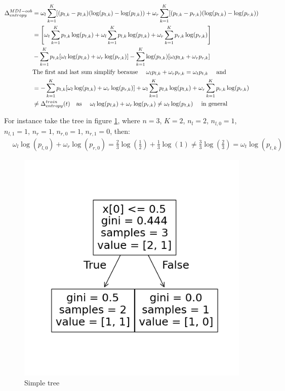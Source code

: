\documentclass{article}
\begin{document}
\begin{align*}
    \Delta_{entropy}^{MDI-oob} &= \omega_l \sum_{k=1}^K [(p_{t,k} - p_{l,k})(\log(p_{t,k}) - \log(p_{l,k})) + \omega_r \sum_{k=1}^K [(p_{t,k} - p_{r,k})(\log(p_{t,k}) - \log(p_{r,k}))\\ 
    &= \left[\omega_t \sum_{k = 1}^K p_{t,k}\log(p_{t,k}) + \omega_{l} \sum_{k = 1}^K p_{l,k}\log(p_{l,k}) + \omega_{r} \sum_{k = 1}^K p_{r,k} \log(p_{r,k}) \right] \\
    &- \sum_{k=1}^K p_{t,k}[\omega_l\log(p_{l,k}) + \omega_r\log(p_{r,k})] - \sum_{k=1}^K \log(p_{t,k})[\omega_lp_{l,k} + \omega_rp_{r,k}] \\
    &\text{The first and last sum simplify because \quad $\omega_l p_{l,k} + \omega_r p_{r,k} = \omega_t p_{t,k} $ \quad and}\\
    &= - \sum_{k=1}^K p_{t,k}[\omega_l\log(p_{l,k}) + \omega_r\log(p_{r,k})] + \omega_{l} \sum_{k = 1}^K p_{l,k}\log(p_{l,k}) + \omega_{r} \sum_{k = 1}^K p_{r,k} \log(p_{r,k}) \\
    & \neq \Delta_{entropy}^{train} (t) \quad \text{as \quad } \omega_l \log(p_{l,k}) + \omega_r \log(p_{r,k}) \neq \omega_t \log(p_{t,k}) \text{ \quad in general} \\
\end{align*}

For instance take the tree in figure \ref{fig:mdioob_ce}, where $n=3$, $K = 2$, $n_l = 2$, $n_{l,0}=1$, $n_{l,1}=1$, $n_r = 1$, $n_{r,0} = 1$, $n_{r,1} = 0$, then:
\begin{align*}
    & \omega_l \log(p_{l,0}) + \omega_r \log(p_{r,0}) = \frac{2}{3} \log(\frac{1}{2}) + \frac{1}{3} \log(1) \neq \frac{3}{3} \log(\frac{2}{3}) = \omega_t \log(p_{t,k})
\end{align*}

\begin{figure}
    \centering
    \includegraphics[width=0.5\linewidth]{figures/mdi_oob_counter_example.png}
    \caption{Simple tree}
    \label{fig:mdioob_ce}
\end{figure}
\end{document}
